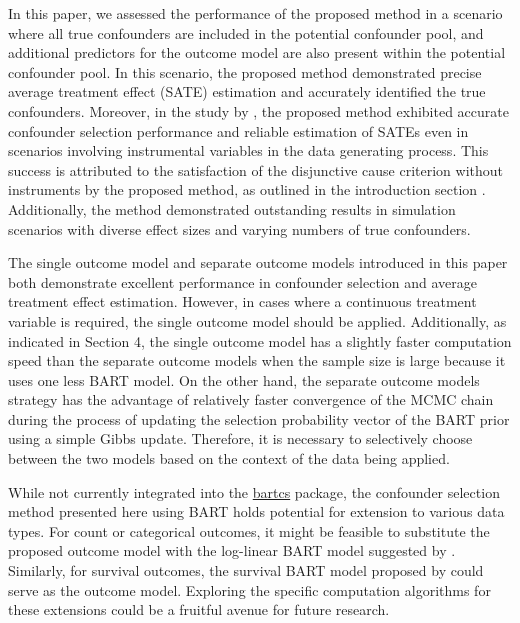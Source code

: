 In this paper, we assessed the performance of the proposed method in a scenario where all true confounders are included in the potential confounder pool, and additional predictors for the outcome model are also present within the potential confounder pool. In this scenario, the proposed method demonstrated precise average treatment effect (SATE) estimation and accurately identified the true confounders. Moreover, in the study by \cite{kim2023bnp}, the proposed method exhibited accurate confounder selection performance and reliable estimation of SATEs even in scenarios involving instrumental variables in the data generating process. This success is attributed to the satisfaction of the disjunctive cause criterion without instruments by the proposed method, as outlined in the introduction section \citep{vanderweele2019principles}. Additionally, the method demonstrated outstanding results in simulation scenarios with diverse effect sizes and varying numbers of true confounders. 

The single outcome model and separate outcome models introduced in this paper both demonstrate excellent performance in confounder selection and average treatment effect estimation. However, in cases where a continuous treatment variable is required, the single outcome model should be applied. Additionally, as indicated in Section 4, the single outcome model has a slightly faster computation speed than the separate outcome models when the sample size is large because it uses one less BART model. On the other hand, the separate outcome models strategy has the advantage of relatively faster convergence of the MCMC chain during the process of updating the selection probability vector of the BART prior using a simple Gibbs update. Therefore, it is necessary to selectively choose between the two models based on the context of the data being applied.

While not currently integrated into the \href{https://CRAN.R-project.org/package=bartcs}{bartcs} package, the confounder selection method presented here using BART holds potential for extension to various data types. For count or categorical outcomes, it might be feasible to substitute the proposed outcome model with the log-linear BART model suggested by \cite{murray2021log}. Similarly, for survival outcomes, the survival BART model proposed by \cite{sparapani2016nonparametric} could serve as the outcome model. Exploring the specific computation algorithms for these extensions could be a fruitful avenue for future research.

